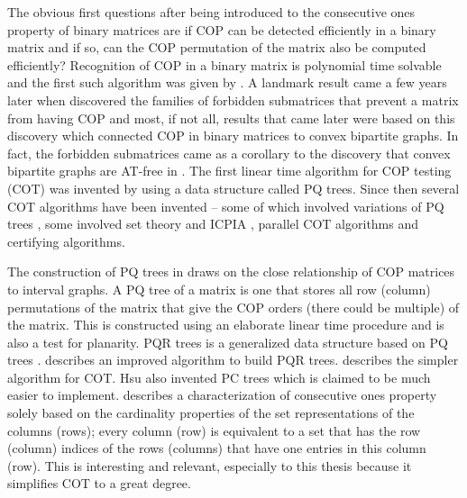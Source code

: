 \documentclass[MS,synopsis]{iitmdiss}
\begin{document}
The obvious first questions after being introduced to the consecutive
ones property of binary matrices are if COP can be detected
efficiently in a binary matrix and if so, can the COP permutation of
the matrix also be computed efficiently?  Recognition of COP in a
binary matrix is polynomial time solvable and the first such algorithm
was given by \cite{fg65}.  A landmark result came a few years later
when \cite{at72} discovered the families of forbidden submatrices that
prevent a matrix from having COP and most, if not all, results that
came later were based on this discovery which connected COP in binary
matrices to convex bipartite graphs. In fact, the forbidden
submatrices came as a corollary to the discovery that convex bipartite
graphs are AT-free in \cite{at72}. The first linear time
algorithm for COP testing (COT) was invented by \cite{bl76} using a
data structure called PQ trees.  Since then several COT algorithms
have been invented -- some of which involved variations of PQ trees
\cite{mm96,wlh01,mcc04}, some involved set theory and ICPIA
\cite{wlh02,nsnrs09}, parallel COT algorithms\cite{as95,bs03,ly91} and
certifying algorithms\cite{mcc04}. %

The construction of PQ trees in \cite{bl76} draws on the
close relationship of COP matrices to interval graphs. A PQ tree of a
matrix is one that stores all row (column) permutations of the matrix
that give the COP orders (there could be multiple) of the matrix. This
is constructed using an elaborate linear time procedure and is also
a test for planarity. %
PQR trees is a generalized data structure based on PQ trees
\cite{mm96,mpt98}.  \cite{tm05} describes an improved algorithm to
build PQR trees. \cite{wlh02}
describes the simpler algorithm for COT. Hsu also invented PC trees
\cite{wlh01}
which is claimed to be much easier to implement. \cite{nsnrs09}
describes a characterization of consecutive ones property solely based
on the cardinality properties of the set representations of the
columns (rows); every column (row) is equivalent to a set that has the
row (column) indices of the rows (columns) that have one entries in
this column (row). This is interesting and relevant, especially to
this thesis because it simplifies COT to a great
degree. 
\end{document}
